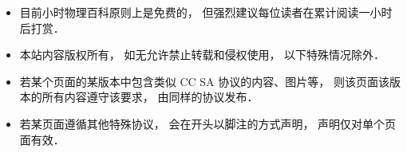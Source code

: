 
\begin{itemize}
\item 目前小时物理百科原则上是免费的， 但强烈建议每位读者在累计阅读一小时后打赏．
\item 本站内容版权所有， 如无允许禁止转载和侵权使用， 以下特殊情况除外．
\item 若某个页面的某版本中包含类似 CC SA 协议的内容、图片等， 则该页面该版本的所有内容遵守该要求， 由同样的协议发布．
\item 若某页面遵循其他特殊协议， 会在开头以脚注的方式声明， 声明仅对单个页面有效．
\end{itemize}
